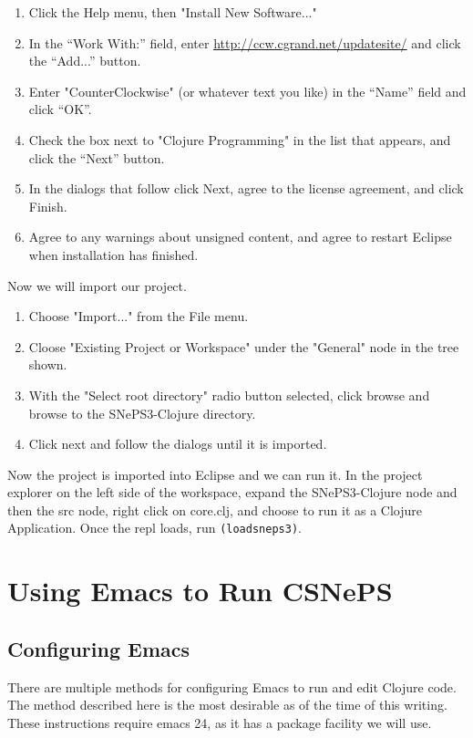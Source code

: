 \documentclass[letterpaper,colorlinks=true,linkcolor=blue]{book}
\begin{document}
\begin{enumerate}
  \item Click the Help menu, then "Install New Software..."
  \item In the ``Work With:'' field, enter \url{http://ccw.cgrand.net/updatesite/} and click the ``Add...'' button.
  \item Enter "CounterClockwise" (or whatever text you like) in the ``Name'' field and click ``OK''.
  \item Check the box next to "Clojure Programming" in the list that appears, and click the ``Next'' button.
  \item In the dialogs that follow click Next, agree to the license agreement, and click Finish.
  \item Agree to any warnings about unsigned content, and agree to restart Eclipse when installation has finished.
\end{enumerate}

Now we will import our project. 

\begin{enumerate}
  \item Choose "Import..." from the File menu.
  \item Cloose "Existing Project or Workspace" under the "General" node in the tree shown.
  \item With the "Select root directory" radio button selected, click browse and browse to the SNePS3-Clojure directory.
  \item Click next and follow the dialogs until it is imported.
\end{enumerate}

Now the project is imported into Eclipse and we can run it. In the project explorer on the left side of the workspace, expand the SNePS3-Clojure node and then the src node, right click on core.clj, and choose to run it as a Clojure Application. Once the repl loads, run \texttt{(loadsneps3)}.

\section{Using Emacs to Run CSNePS}

\subsection{Configuring Emacs}

There are multiple methods for configuring Emacs to run and edit Clojure code. The method described here is the most desirable as of the time of this writing. These instructions require emacs 24, as it has a package facility we will use. 
\end{document}
